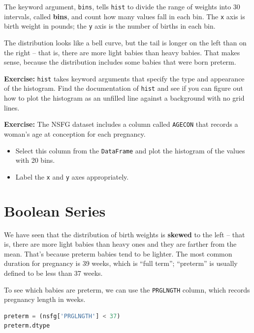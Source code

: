 The keyword argument, \passthrough{\lstinline!bins!}, tells
\passthrough{\lstinline!hist!} to divide the range of weights into 30
intervals, called \textbf{bins}, and count how many values fall in each
bin. The \passthrough{\lstinline!x!} axis is birth weight in pounds; the
\passthrough{\lstinline!y!} axis is the number of births in each bin.

The distribution looks like a bell curve, but the tail is longer on the
left than on the right -- that is, there are more light babies than
heavy babies. That makes sense, because the distribution includes some
babies that were born preterm.

\textbf{Exercise:} \passthrough{\lstinline!hist!} takes keyword
arguments that specify the type and appearance of the histogram. Find
the documentation of \passthrough{\lstinline!hist!} and see if you can
figure out how to plot the histogram as an unfilled line against a
background with no grid lines.

\textbf{Exercise:} The NSFG dataset includes a column called
\passthrough{\lstinline!AGECON!} that records a woman's age at
conception for each pregnancy.

\begin{itemize}
\item
  Select this column from the \passthrough{\lstinline!DataFrame!} and
  plot the histogram of the values with 20 bins.
\item
  Label the \passthrough{\lstinline!x!} and \passthrough{\lstinline!y!}
  axes appropriately.
\end{itemize}

\hypertarget{boolean-series}{%
\section{Boolean Series}\label{boolean-series}}

We have seen that the distribution of birth weights is \textbf{skewed}
to the left -- that is, there are more light babies than heavy ones and
they are farther from the mean. That's because preterm babies tend to be
lighter. The most common duration for pregnancy is 39 weeks, which is
``full term''; ``preterm'' is usually defined to be less than 37 weeks.

To see which babies are preterm, we can use the
\passthrough{\lstinline!PRGLNGTH!} column, which records pregnancy
length in weeks.

\begin{lstlisting}[language=Python,style=source]
preterm = (nsfg['PRGLNGTH'] < 37)
preterm.dtype
\end{lstlisting}

